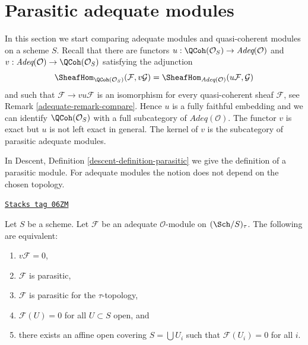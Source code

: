 \section{Parasitic adequate modules}
\label{adequate-section-parasitic}
In this section we start comparing adequate modules and quasi-coherent
modules on a scheme $S$. Recall that there are functors
$u : \QCoh(\mathcal{O}_S) \to \textit{Adeq}(\mathcal{O})$
and
$v : \textit{Adeq}(\mathcal{O}) \to \QCoh(\mathcal{O}_S)$
satisfying the adjunction
$$
\SheafHom_{\QCoh(\mathcal{O}_S)}(\mathcal{F}, v\mathcal{G})
=
\SheafHom_{\textit{Adeq}(\mathcal{O})}(u\mathcal{F}, \mathcal{G})
$$
and such that $\mathcal{F} \to vu\mathcal{F}$ is an isomorphism for
every quasi-coherent sheaf $\mathcal{F}$, see
Remark \ref{adequate-remark-compare}.
Hence $u$ is a fully faithful embedding and we can identify
$\QCoh(\mathcal{O}_S)$ with a full subcategory of
$\textit{Adeq}(\mathcal{O})$.
The functor $v$ is exact but $u$ is not left exact in general.
The kernel of $v$ is the subcategory of parasitic adequate modules.

\medskip\noindent
In Descent, Definition \ref{descent-definition-parasitic}
we give the definition of a parasitic module.
For adequate modules the notion does not depend
on the chosen topology.

\begin{lemma}
\label{adequate-lemma-parasitic-adequate}
\href{https://stacks.math.columbia.edu/tag/06ZM}{\texttt{Stacks tag 06ZM}}

Let $S$ be a scheme.
Let $\mathcal{F}$ be an adequate $\mathcal{O}$-module on
$(\Sch/S)_\tau$. The following are equivalent:
\begin{enumerate}
\item $v\mathcal{F} = 0$,
\item $\mathcal{F}$ is parasitic,
\item $\mathcal{F}$ is parasitic for the $\tau$-topology,
\item $\mathcal{F}(U) = 0$ for all $U \subset S$ open, and
\item there exists an affine open covering $S = \bigcup U_i$
such that $\mathcal{F}(U_i) = 0$ for all $i$.
\end{enumerate}
\end{lemma}

